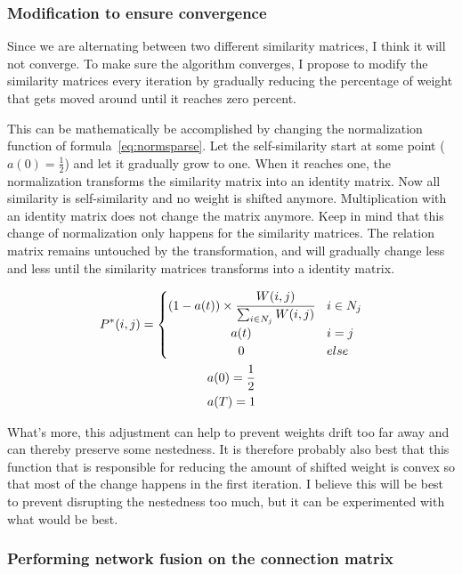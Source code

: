 \documentclass{article}
\begin{document}
\subsubsection{Modification to ensure convergence}

Since we are alternating between two different similarity matrices,
I think it will not converge.
To make sure the algorithm converges, I propose to modify the
similarity matrices every iteration by gradually reducing the percentage of weight
that gets moved around until it reaches zero percent.

This can be mathematically be accomplished by changing the normalization
function of formula~\ref{eq:normsparse}.
Let the self-similarity start at some point ($a(0) = \frac{1}{2}$) 
and let it gradually grow to one. 
When it reaches one, the normalization transforms the similarity matrix into
an identity matrix. Now all similarity is self-similarity 
and no weight is shifted anymore. 
Multiplication with an identity matrix does not change the matrix anymore.
Keep in mind that this change of normalization only happens for the 
similarity matrices. The relation matrix remains untouched by the transformation, 
and will gradually change less and less until the similarity matrices transforms
into a identity matrix. 

\begin{equation}
    \begin{gathered}
    P^*(i, j) = 
    \begin{cases}
        (1 - a(t)) \times \cfrac{W(i, j)}{\sum_{i \in N_j}W(i, j)} & i \in N_j \\
        \hfil a(t) & i = j \\
        \hfil 0 & else
    \end{cases} \\
    a(0) = \frac{1}{2} \\
    a(T) = 1
    \end{gathered}
\end{equation}

What's more, this adjustment can help to prevent weights drift too far away and
can thereby preserve some nestedness. It is therefore probably also best
that this function that is responsible for reducing the amount of shifted weight
is convex so that most of the change happens in the 
first iteration. I believe this will be best to prevent disrupting the 
nestedness too much, but it can be experimented with what would be best.

\subsubsection{Performing network fusion on the connection matrix}
\end{document}
